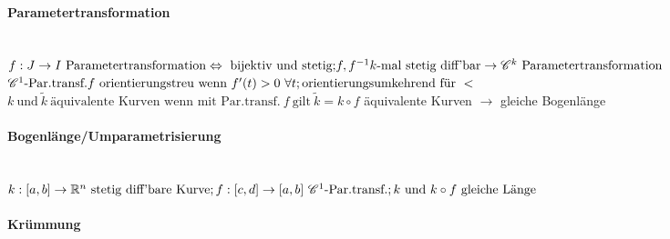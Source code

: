 \documentclass[paper=a3,paper=landscape, fontsize=9pt,DIV=25]{scrartcl}
\newcommand{\real}{{\mathbb{R}}}
\begin{document}
\begin{multicols*}{4}
  \paragraph{Parametertransformation}\hspace{0pt} \\
  $ f: J \rightarrow I \ \text{Parametertransformation} \Leftrightarrow \ \text{bijektiv und stetig;}\\  f, f^{-1} k\text{-mal stetig diff'bar} \rightarrow \mathscr{C}^k \ \text{Parametertransformation}$\\
  $\mathscr{C}^1 \text{-Par.transf.} f \ \text{orientierungstreu wenn} \ f'(t) > 0 \ \forall t; \\ \text{orientierungsumkehrend für} \ <$\\
  $ k \ \text{und}\ \tilde{k} \ \text{äquivalente Kurven wenn mit Par.transf.}\ f \ \text{gilt}\ \tilde{k} = k \circ f$ äquivalente Kurven $\rightarrow$ gleiche Bogenlänge\\


  \paragraph{Bogenlänge/Umparametrisierung}\hspace{0pt} \\

  $k: [a,b] \rightarrow \real^n \ \text{stetig diff'bare Kurve};\\ f:[c,d] \rightarrow [a,b] \ \mathscr{C}^1\text{-Par.transf.}; k \ \text{und}\ k \circ f \ \text{gleiche Länge} $



  \paragraph{Krümmung}



\end{multicols*}
\end{document}
